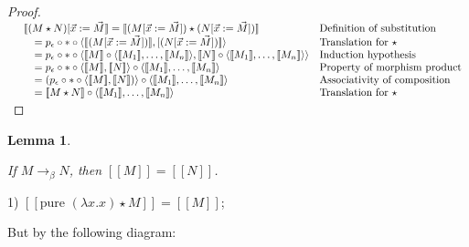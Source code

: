 \documentclass[a4paper]{article}
\newtheorem{lemma}{Lemma}
\begin{document}
\begin{proof}
$\begin{array}{lll}
& [\![(M \star N) [ \vec{x} := \vec{M}] \!] = [\![(M [\vec{x} := \vec{M}]) \star (N [ \vec{x} := \vec{M}])]\!]& \text{Definition of substitution} \\
&\quad = p_{\epsilon} \circ \ast \circ \langle [\![(M [\vec{x} := \vec{M}])]\!], [(N [\vec{x} := \vec{M}])]\!] \rangle & \text{Translation for $\star$} \\
&\quad = p_{\epsilon} \circ \ast \circ \langle [\![M]\!] \circ \langle [\![M_1]\!], \dots,
[\![M_n]\!] \rangle, [\![N]\!] \circ \langle [\![M_1]\!], \dots,
[\![M_n]\!] \rangle\rangle & \text{Induction hypothesis} \\
&\quad = p_{\epsilon} \circ \ast \circ \langle  [\![M]\!], [\![N]\!] \rangle \circ \langle [\![M_1]\!], \dots,
[\![M_n]\!] \rangle& \text{Property of morphism product} \\
&\quad = (p_{\epsilon} \circ \ast \circ \langle  [\![M]\!], [\![N]\!]) \rangle \circ \langle [\![M_1]\!],
\dots, [\![M_n]\!] \rangle& \text{Associativity of composition} \\
&\quad = [\![M \star N]\!] \circ \langle [\![M_1]\!], \dots, [\![M_n]\!] \rangle& \text{Translation for $
\star$}
\end{array}$

\end{proof}

\begin{lemma}

$ $

If $M \rightarrow_{\beta} N$, then $[\![M]\!] = [\![N]\!]$.

\end{lemma}

1) $[\![\text{pure } (\lambda x. x) \star M]\!] = [\![M]\!]$;

\vspace{\baselineskip}

\begin{prooftree}
\end{prooftree}

But by the following diagram:

\end{document}
